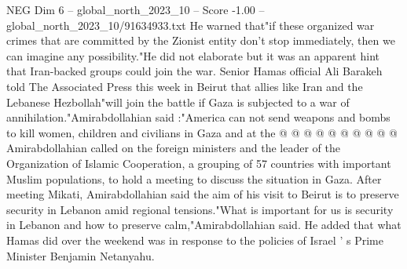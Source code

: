\begin{textsample}{NEG Dim 6 – global\_north\_2023\_10 – Score -1.00 – global\_north\_2023\_10/91634933.txt}
He warned that"if these organized war crimes that are committed by the Zionist entity don't stop immediately, then we can imagine any possibility."He did not elaborate but it was an apparent hint that Iran-backed groups could join the war.
Senior Hamas official Ali Barakeh told The Associated Press this week in Beirut that allies like Iran and the Lebanese Hezbollah"will join the battle if Gaza is subjected to a war of annihilation."Amirabdollahian said :"America can not send weapons and bombs to kill women, children and civilians in Gaza and at the @ @ @ @ @ @ @ @ @ @ Amirabdollahian called on the foreign ministers and the leader of the Organization of Islamic Cooperation, a grouping of 57 countries with important Muslim populations, to hold a meeting to discuss the situation in Gaza.
After meeting Mikati, Amirabdollahian said the aim of his visit to Beirut is to preserve security in Lebanon amid regional tensions."What is important for us is security in Lebanon and how to preserve calm,"Amirabdollahian said.
He added that what Hamas did over the weekend was in response to the policies of Israel ' s Prime Minister Benjamin Netanyahu.

\end{textsample}
